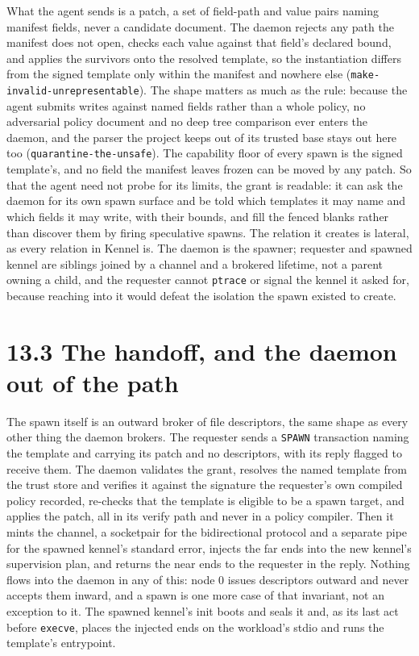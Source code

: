 What the agent sends is a patch, a set of field-path and value pairs
naming manifest fields, never a candidate document. The daemon rejects
any path the manifest does not open, checks each value against that
field's declared bound, and applies the survivors onto the resolved
template, so the instantiation differs from the signed template only
within the manifest and nowhere else
(\texttt{make-invalid-unrepresentable}). The shape matters as much as
the rule: because the agent submits writes against named fields rather
than a whole policy, no adversarial policy document and no deep tree
comparison ever enters the daemon, and the parser the project keeps out
of its trusted base stays out here too (\texttt{quarantine-the-unsafe}).
The capability floor of every spawn is the signed template's, and no
field the manifest leaves frozen can be moved by any patch. So that the
agent need not probe for its limits, the grant is readable: it can ask
the daemon for its own spawn surface and be told which templates it may
name and which fields it may write, with their bounds, and fill the
fenced blanks rather than discover them by firing speculative spawns.
The relation it creates is lateral, as every relation in Kennel is. The
daemon is the spawner; requester and spawned kennel are siblings joined
by a channel and a brokered lifetime, not a parent owning a child, and
the requester cannot \texttt{ptrace} or signal the kennel it asked for,
because reaching into it would defeat the isolation the spawn existed to
create.

\hypertarget{the-handoff-and-the-daemon-out-of-the-path}{%
\section{13.3 The handoff, and the daemon out of the
path}\label{the-handoff-and-the-daemon-out-of-the-path}}

The spawn itself is an outward broker of file descriptors, the same
shape as every other thing the daemon brokers. The requester sends a
\texttt{SPAWN} transaction naming the template and carrying its patch
and no descriptors, with its reply flagged to receive them. The daemon
validates the grant, resolves the named template from the trust store
and verifies it against the signature the requester's own compiled
policy recorded, re-checks that the template is eligible to be a spawn
target, and applies the patch, all in its verify path and never in a
policy compiler. Then it mints the channel, a socketpair for the
bidirectional protocol and a separate pipe for the spawned kennel's
standard error, injects the far ends into the new kennel's supervision
plan, and returns the near ends to the requester in the reply. Nothing
flows into the daemon in any of this: node 0 issues descriptors outward
and never accepts them inward, and a spawn is one more case of that
invariant, not an exception to it. The spawned kennel's init boots and
seals it and, as its last act before \texttt{execve}, places the
injected ends on the workload's stdio and runs the template's
entrypoint.

